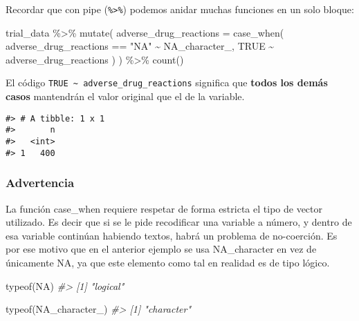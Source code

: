 \documentclass[
]{book}
\newenvironment{Shaded}{\begin{snugshade}}{\end{snugshade}}
\newcommand{\AttributeTok}[1]{\textcolor[rgb]{0.77,0.63,0.00}{#1}}
\newcommand{\CommentTok}[1]{\textcolor[rgb]{0.56,0.35,0.01}{\textit{#1}}}
\newcommand{\ConstantTok}[1]{\textcolor[rgb]{0.00,0.00,0.00}{#1}}
\newcommand{\FunctionTok}[1]{\textcolor[rgb]{0.00,0.00,0.00}{#1}}
\newcommand{\NormalTok}[1]{#1}
\newcommand{\SpecialCharTok}[1]{\textcolor[rgb]{0.00,0.00,0.00}{#1}}
\newcommand{\StringTok}[1]{\textcolor[rgb]{0.31,0.60,0.02}{#1}}
\begin{document}
Recordar que con pipe (\texttt{\%\textgreater{}\%}) podemos anidar muchas funciones en un solo bloque:

\begin{Shaded}
\begin{Highlighting}[]
\NormalTok{trial\_data }\SpecialCharTok{\%\textgreater{}\%}
  \FunctionTok{mutate}\NormalTok{(}
    \AttributeTok{adverse\_drug\_reactions =} \FunctionTok{case\_when}\NormalTok{(}
\NormalTok{      adverse\_drug\_reactions }\SpecialCharTok{==} \StringTok{"NA"} \SpecialCharTok{\textasciitilde{}} \ConstantTok{NA\_character\_}\NormalTok{,}
      \ConstantTok{TRUE} \SpecialCharTok{\textasciitilde{}}\NormalTok{ adverse\_drug\_reactions}
\NormalTok{    )}
\NormalTok{  ) }\SpecialCharTok{\%\textgreater{}\%} 
  \FunctionTok{count}\NormalTok{()}
\end{Highlighting}
\end{Shaded}

El código \texttt{TRUE\ \textasciitilde{}\ adverse\_drug\_reactions} significa que \textbf{todos los demás casos} mantendrán el valor original que el de la variable.

\begin{verbatim}
#> # A tibble: 1 x 1
#>       n
#>   <int>
#> 1   400
\end{verbatim}

\hypertarget{advertencia}{%
\subsubsection{Advertencia}\label{advertencia}}

La función case\_when requiere respetar de forma estricta el tipo de vector utilizado. Es decir que si se le pide recodificar una variable a número, y dentro de esa variable continúan habiendo textos, habrá un problema de no-coerción. Es por ese motivo que en el anterior ejemplo se usa NA\_character en vez de únicamente NA, ya que este elemento como tal en realidad es de tipo lógico.

\begin{Shaded}
\begin{Highlighting}[]
\FunctionTok{typeof}\NormalTok{(}\ConstantTok{NA}\NormalTok{)}
\CommentTok{\#\textgreater{} [1] "logical"}
\end{Highlighting}
\end{Shaded}

\begin{Shaded}
\begin{Highlighting}[]
\FunctionTok{typeof}\NormalTok{(}\ConstantTok{NA\_character\_}\NormalTok{)}
\CommentTok{\#\textgreater{} [1] "character"}
\end{Highlighting}
\end{Shaded}
\end{document}
